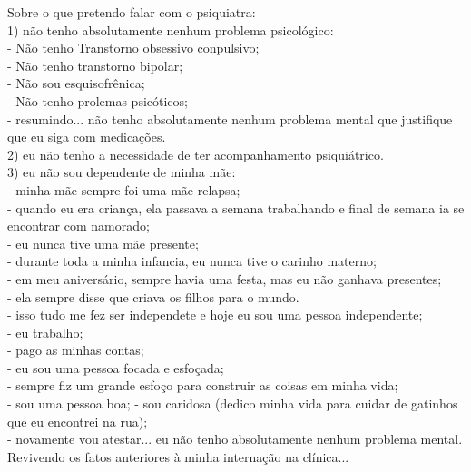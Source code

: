 \documentclass{book}
\begin{document}
Sobre o que pretendo falar com o psiquiatra: \\

1) não tenho absolutamente nenhum problema psicológico: \\

- Não tenho Transtorno obsessivo conpulsivo; \\
- Não tenho transtorno bipolar; \\
- Não sou esquisofrênica; \\
- Não tenho prolemas psicóticos; \\
- resumindo... não tenho absolutamente nenhum problema mental que justifique que eu siga com medicações. \\

2) eu não tenho a necessidade de ter acompanhamento psiquiátrico. \\

3) eu não sou dependente de minha mãe: \\

- minha mãe sempre foi uma mãe relapsa; \\
- quando eu era criança, ela passava a semana trabalhando e final de semana ia se encontrar com namorado; \\
- eu nunca tive uma mãe presente; \\
- durante toda a minha infancia, eu nunca tive o carinho materno; \\
- em meu aniversário, sempre havia uma festa, mas eu não ganhava presentes; \\
- ela sempre disse que criava os filhos para o mundo. \\

- isso tudo me fez ser independete e hoje eu sou uma pessoa independente; \\

- eu trabalho; \\
- pago as minhas contas; \\
- eu sou uma pessoa focada e esfoçada; \\
- sempre fiz um grande esfoço para construir as coisas em minha vida; \\
- sou uma pessoa boa;
- sou caridosa (dedico minha vida para cuidar de gatinhos que eu encontrei na rua); \\
- novamente vou atestar... eu não tenho absolutamente nenhum problema mental. \\


Revivendo os fatos anteriores à minha internação na clínica... \\
\end{document}
